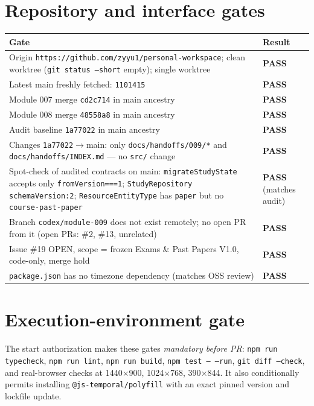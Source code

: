 \documentclass[11pt,a4paper]{article}
\newcommand{\sha}[1]{\texttt{\small #1}}
\newcommand{\PASS}{\textcolor{green!50!black}{\textbf{PASS}}}
\begin{document}
\section{Repository and interface gates}
\begin{tabularx}{\textwidth}{@{}Xl@{}}
\toprule
Gate & Result \\
\midrule
Origin \texttt{https://github.com/zyyu1/personal-workspace}; clean worktree (\texttt{git status --short} empty); single worktree & \PASS \\
Latest main freshly fetched: \sha{1101415} & \PASS \\
Module 007 merge \sha{cd2c714} in main ancestry & \PASS \\
Module 008 merge \sha{48558a8} in main ancestry & \PASS \\
Audit baseline \sha{1a77022} in main ancestry & \PASS \\
Changes \sha{1a77022}$\to$main: only \texttt{docs/handoffs/009/*} and \texttt{docs/handoffs/INDEX.md} --- no \texttt{src/} change & \PASS \\
Spot-check of audited contracts on main: \texttt{migrateStudyState} accepts only \texttt{fromVersion===1}; \texttt{StudyRepository} \texttt{schemaVersion:2}; \texttt{ResourceEntityType} has \texttt{paper} but no \texttt{course-past-paper} & \PASS{} (matches audit) \\
Branch \texttt{codex/module-009} does not exist remotely; no open PR from it (open PRs: \#2, \#13, unrelated) & \PASS \\
Issue \#19 OPEN, scope = frozen Exams \& Past Papers V1.0, code-only, merge hold & \PASS \\
\texttt{package.json} has no timezone dependency (matches OSS review) & \PASS \\
\bottomrule
\end{tabularx}

\section{Execution-environment gate}
The start authorization makes these gates \emph{mandatory before PR}: \texttt{npm run typecheck}, \texttt{npm run lint}, \texttt{npm run build}, \texttt{npm test -- --run}, \texttt{git diff --check}, and real-browser checks at 1440$\times$900, 1024$\times$768, 390$\times$844. It also conditionally permits installing \texttt{@js-temporal/polyfill} with an exact pinned version and lockfile update.
\end{document}
